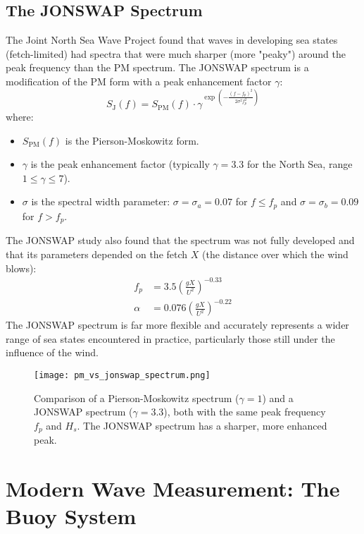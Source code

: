 \documentclass[12pt]{article}
\begin{document}
\subsection{The JONSWAP Spectrum}
The Joint North Sea Wave Project found that waves in developing sea states (fetch-limited) had spectra that were much sharper (more "peaky") around the peak frequency than the PM spectrum. The JONSWAP spectrum is a modification of the PM form with a peak enhancement factor $\gamma$:
\begin{equation}
S_{\text{J}}(f) = S_{\text{PM}}(f) \cdot \gamma^{\exp\left( -\frac{(f - f_p)^2}{2\sigma^2 f_p^2} \right)}
\end{equation}
where:
\begin{itemize}
    \item $S_{\text{PM}}(f)$ is the Pierson-Moskowitz form.
    \item $\gamma$ is the peak enhancement factor (typically $\gamma=3.3$ for the North Sea, range $1 \leq \gamma \leq 7$).
    \item $\sigma$ is the spectral width parameter: $\sigma = \sigma_a = 0.07$ for $f \leq f_p$ and $\sigma = \sigma_b = 0.09$ for $f > f_p$.
\end{itemize}
The JONSWAP study also found that the spectrum was not fully developed and that its parameters depended on the fetch $X$ (the distance over which the wind blows):
\begin{align}
f_p &= 3.5 \left( \frac{gX}{U^2} \right)^{-0.33} \\
\alpha &= 0.076 \left( \frac{gX}{U^2} \right)^{-0.22}
\end{align}
The JONSWAP spectrum is far more flexible and accurately represents a wider range of sea states encountered in practice, particularly those still under the influence of the wind.

\begin{figure}[H]
\centering
\texttt{[image: pm\_vs\_jonswap\_spectrum.png]} %
\caption{Comparison of a Pierson-Moskowitz spectrum ($\gamma=1$) and a JONSWAP spectrum ($\gamma=3.3$), both with the same peak frequency $f_p$ and $H_s$. The JONSWAP spectrum has a sharper, more enhanced peak.}
\label{fig:pm_vs_j}
\end{figure}

\section{Modern Wave Measurement: The Buoy System}
\end{document}
